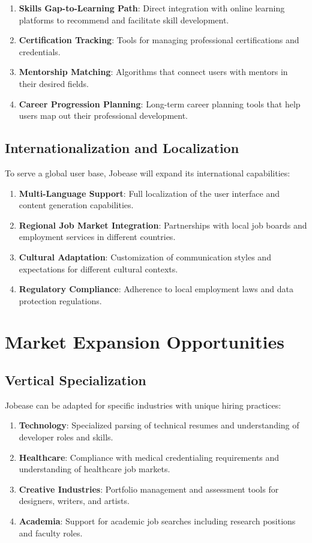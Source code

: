 \documentclass[12pt,a4paper]{report}
\begin{document}
\begin{enumerate}
    \item \textbf{Skills Gap-to-Learning Path}: Direct integration with online learning platforms to recommend and facilitate skill development.
    \item \textbf{Certification Tracking}: Tools for managing professional certifications and credentials.
    \item \textbf{Mentorship Matching}: Algorithms that connect users with mentors in their desired fields.
    \item \textbf{Career Progression Planning}: Long-term career planning tools that help users map out their professional development.
\end{enumerate}

\subsection*{Internationalization and Localization}

To serve a global user base, Jobease will expand its international capabilities:

\begin{enumerate}
    \item \textbf{Multi-Language Support}: Full localization of the user interface and content generation capabilities.
    \item \textbf{Regional Job Market Integration}: Partnerships with local job boards and employment services in different countries.
    \item \textbf{Cultural Adaptation}: Customization of communication styles and expectations for different cultural contexts.
    \item \textbf{Regulatory Compliance}: Adherence to local employment laws and data protection regulations.
\end{enumerate}

\section*{Market Expansion Opportunities}

\subsection*{Vertical Specialization}

Jobease can be adapted for specific industries with unique hiring practices:

\begin{enumerate}
    \item \textbf{Technology}: Specialized parsing of technical resumes and understanding of developer roles and skills.
    \item \textbf{Healthcare}: Compliance with medical credentialing requirements and understanding of healthcare job markets.
    \item \textbf{Creative Industries}: Portfolio management and assessment tools for designers, writers, and artists.
    \item \textbf{Academia}: Support for academic job searches including research positions and faculty roles.
\end{enumerate}
\end{document}
